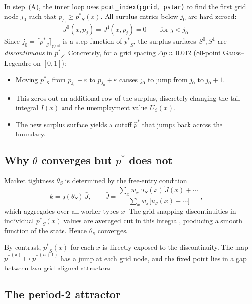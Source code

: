 \documentclass[11pt,a4paper]{article}
\newcommand{\pstar}{\mathord{p^{*}}}
\newcommand{\code}[1]{\texttt{#1}}
\theoremstyle{definition}
\begin{document}
In step~(A), the inner loop uses \code{pcut\_index(pgrid, pstar)} to find the
first grid node $j_0$ such that $p_{j_0} \geq \pstar_S(x)$.  All surplus
entries below $j_0$ are hard-zeroed:
%
\begin{equation}
    J^0(x, p_j) = J^1(x, p_j) = 0 \qquad \text{for } j < j_0.
    \label{eq:hard-zero}
\end{equation}
%
Since $j_0 = \lceil \pstar_S \rceil_{\text{grid}}$ is a step function of
$\pstar_S$, the surplus surfaces $S^0, S^1$ are \emph{discontinuous} in
$\pstar_S$.  Concretely, for a grid spacing $\Delta p \approx 0.012$
(80-point Gauss--Legendre on $[0,1]$):
%
\begin{itemize}
    \item Moving $\pstar_S$ from $p_{j_0} - \varepsilon$ to
          $p_{j_0} + \varepsilon$ causes $j_0$ to jump from $j_0$ to
          $j_0 + 1$.
    \item This zeros out an additional row of the surplus, discretely
          changing the tail integral $I(x)$ and the unemployment value
          $U_S(x)$.
    \item The new surplus surface yields a cutoff $\hat{p}^{*}$ that
          jumps back across the boundary.
\end{itemize}

\subsection{Why $\theta$ converges but $\pstar$ does not}

Market tightness $\theta_S$ is determined by the free-entry condition
\[
    k = q(\theta_S)\, \bar{J}, \qquad
    \bar{J} = \frac{\sum_{x} w_x \bigl[u_S(x)\, \tilde{J}(x) +
                    \cdots\bigr]}
                   {\sum_{x} w_x \bigl[u_S(x) + \cdots\bigr]},
\]
which aggregates over all worker types $x$.  The grid-snapping
discontinuities in individual $\pstar_S(x)$ values are averaged out in this
integral, producing a smooth function of the state.  Hence $\theta_S$
converges.

By contrast, $\pstar_S(x)$ for each $x$ is directly exposed to the
discontinuity.  The map $\pstar^{(n)} \mapsto \pstar^{(n+1)}$ has a jump at
each grid node, and the fixed point lies in a gap between two grid-aligned
attractors.

\subsection{The period-2 attractor}
\end{document}
